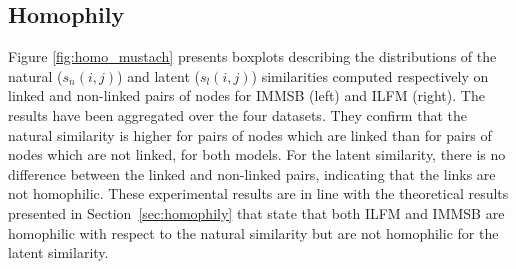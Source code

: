 \subsection{Homophily}

Figure \ref{fig:homo_mustach} presents boxplots describing the distributions of the natural ($s_n(i,j)$) and latent ($s_l(i,j)$) similarities computed respectively on linked and non-linked pairs of nodes for IMMSB (left) and ILFM (right). The results have been aggregated over the four datasets. They confirm that the natural similarity is  higher for pairs of nodes which are linked than for pairs of nodes which are not linked, for both models. 
For the latent similarity,  there is no difference between the linked and non-linked pairs, indicating that the links are not homophilic. These experimental results are in line with the theoretical results presented in Section~\ref{sec:homophily} that state that both ILFM and IMMSB are homophilic with respect to the natural similarity but are not homophilic for the latent similarity.

